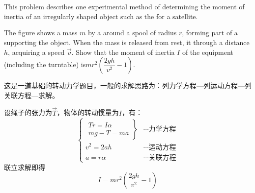 \chapter[转动动力学]{}
\begin{solution}
	This problem describes one experimental method of
	determining the moment of inertia of an irregularly
	shaped object such as the  for a satellite. 
	\begin{center}
	\end{center}
	
	The figure shows a mass $m$  by a  
	around a spool of radius $r$, forming part of a 
	supporting the object. When the mass is released from
	rest, it  through a distance $h$, acquiring a speed
	$\vec{v}$. Show that the moment of inertia $I$ of the equipment
	(including the turntable) is\quad$mr^2(\dfrac{2gh}{v^2}-1)$. 
	
	\tcbrule
	
	这是一道基础的转动力学题目，一般的求解思路为：列力学方程---列运动方程---列关联方程---求解。
	
	设绳子的张力为$\vec{T}$，物体的转动惯量为$I$，有：
	\[\left\{
		\begin{array}{cc}
			\left.\begin{array}{c}
				Tr=I\alpha\\
				mg-T=ma
			\end{array}\right\}&\cdots\text{力学方程}\\
			v^2=2ah&\cdots\text{运动方程}\\
			a=r\alpha&\cdots\text{关联方程}
		\end{array}
		\right.\]
	联立求解即得\[I=mr^2(\dfrac{2gh}{v^2}-1)\]
\end{solution}
